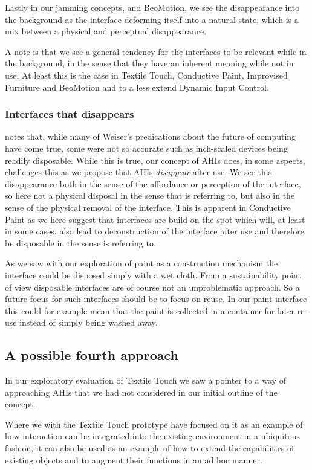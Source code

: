 Lastly in our jamming concepts, and BeoMotion, we see the disappearance into the background as the interface deforming itself into a natural state, which is a mix between a physical and perceptual disappearance.  

A note is that we see a general tendency for the interfaces to be relevant while in the background, in the sense that they have an inherent meaning while not in use.
At least this is the case in Textile Touch, Conductive Paint, Improvised Furniture and BeoMotion and to a less extend Dynamic Input Control.

\subsubsection{Interfaces that disappears}
\citet{abowd2012next} notes that, while many of Weiser's predications about the future of computing have come true, some were not so accurate such as inch-scaled devices being readily disposable.
While this is true, our concept of AHIs does, in some aspects, challenges this as we propose that AHIs \emph{disappear} after use.
We see this disappearance both in the sense of the affordance or perception of the interface, so here not a physical disposal in the sense that \citeauthor{abowd2012next} is referring to, but also in the sense of the physical removal of the interface.
This is apparent in Conductive Paint as we here suggest that interfaces are build on the spot which will, at least in some cases, also lead to deconstruction of the interface after use and therefore be disposable in the sense \citeauthor{abowd2012next} is referring to.

As we saw with our exploration of paint as a construction mechanism the interface could be disposed simply with a wet cloth.
From a sustainability point of view disposable interfaces are of course not an unproblematic approach.
So a future focus for such interfaces should be to focus on reuse.
In our paint interface this could for example mean that the paint is collected in a container for later re-use instead of simply being washed away. 

\subsection{A possible fourth approach}
In our exploratory evaluation of Textile Touch we saw a pointer to a way of approaching AHIs that we had not considered in our initial outline of the concept.

Where we with the Textile Touch prototype have focused on it as an example of how interaction can be integrated into the existing environment in a ubiquitous fashion, it can also be used as an example of how to extend the capabilities of existing objects and to augment their functions in an ad hoc manner.

